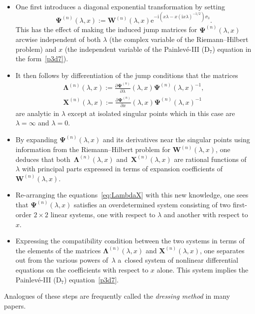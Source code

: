 \documentclass[11pt]{article}
\numberwithin{equation}{section}
\numberwithin{equation}{section}
\begin{document}
\begin{itemize}\itemsep=0pt
\item One first introduces a diagonal exponential transformation by setting
\begin{equation*}
\boldsymbol{\Psi}^{(n)}(\lambda,x):=\mathbf{W}^{(n)}(\lambda,x)\mathrm{e}^{-\mathrm{i} (x\lambda-x(\mathrm{i} x\lambda)^{-1/2})\sigma_3}.
\end{equation*}
This has the effect of making the induced jump matrices for $\boldsymbol{\Psi}^{(n)}(\lambda,x)$ arcwise independent of both $\lambda$ (the complex variable of the Riemann--Hilbert problem) and $x$ (the independent variable of the Painlev\'e-III (D$_7$) equation in the form~\eqref{p3d7}).
\item It then follows by differentiation of the jump conditions that the matrices
\begin{gather}
\boldsymbol{\Lambda}^{(n)}(\lambda,x):=\frac{\partial\boldsymbol{\Psi}^{(n)}}{\partial\lambda}(\lambda,x)\boldsymbol{\Psi}^{(n)}(\lambda,x)^{-1},\nonumber\\
 \mathbf{X}^{(n)}(\lambda,x):=\frac{\partial\boldsymbol{\Psi}^{(n)}}{\partial x}(\lambda,x)\boldsymbol{\Psi}^{(n)}(\lambda,x)^{-1}
 \label{eq:LambdaX}
 \end{gather}
are analytic in $\lambda$ except at isolated singular points which in this case are $\lambda=\infty$ and $\lambda=0$.
\item By expanding $\boldsymbol{\Psi}^{(n)}(\lambda,x)$ and its derivatives near the singular points using information from the Riemann--Hilbert problem for $\mathbf{W}^{(n)}(\lambda,x)$, one deduces that both~$\boldsymbol{\Lambda}^{(n)}(\lambda,x)$ and~$\mathbf{X}^{(n)}(\lambda,x)$ are rational functions of $\lambda$ with principal parts expressed in terms of expansion coefficients of $\mathbf{W}^{(n)}(\lambda,x)$.
\item Re-arranging the equations~\eqref{eq:LambdaX} with this new knowledge, one sees that $\boldsymbol{\Psi}^{(n)}(\lambda,x)$ satisfies an overdetermined system consisting of two first-order $2\times 2$ linear systems, one with respect to $\lambda$ and another with respect to $x$.
\item Expressing the compatibility condition between the two systems in terms of the elements of the matrices $\boldsymbol{\Lambda}^{(n)}(\lambda,x)$ and $\mathbf{X}^{(n)}(\lambda,x)$, one separates out from the various powers of~$\lambda$ a~closed system of nonlinear differential equations on the coefficients with respect to $x$ alone. This system implies the Painlev\'e-III (D$_7$) equation~\eqref{p3d7}.
\end{itemize}
Analogues of these steps are frequently called the \emph{dressing method} in many papers.
\end{document}
